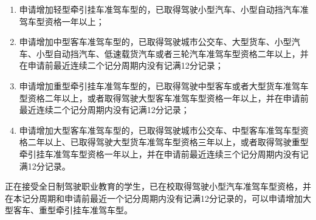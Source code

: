 \begin{enumerate}
    \item 申请增加轻型牵引挂车准驾车型的，已取得驾驶小型汽车、小型自动挡汽车准驾车型资格一年以上；
    \item 申请增加中型客车准驾车型的，已取得驾驶城市公交车、大型货车、小型汽车、小型自动挡汽车、低速载货汽车或者三轮汽车准驾车型资格二年以上，并在申请前最近连续二个记分周期内没有记满12分记录；
    \item 申请增加重型牵引挂车准驾车型的，已取得驾驶中型客车或者大型货车准驾车型资格二年以上，或者取得驾驶大型客车准驾车型资格一年以上，并在申请前最近连续二个记分周期内没有记满12分记录；
    \item 申请增加大型客车准驾车型的，已取得驾驶城市公交车、中型客车准驾车型资格二年以上、已取得驾驶大型货车准驾车型资格三年以上，或者取得驾驶重型牵引挂车准驾车型资格一年以上，并在申请前最近连续三个记分周期内没有记满12分记录。
\end{enumerate}

正在接受全日制驾驶职业教育的学生，已在校取得驾驶小型汽车准驾车型资格，并在本记分周期和申请前最近一个记分周期内没有记满12分记录的，可以申请增加大型客车、重型牵引挂车准驾车型。